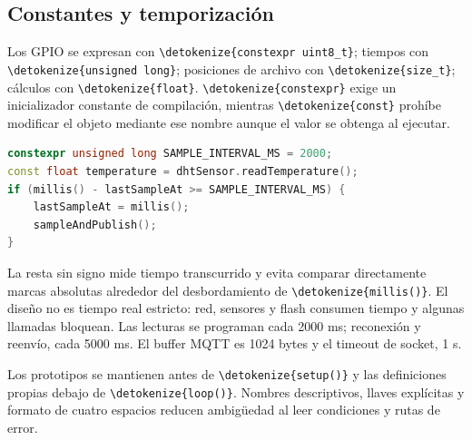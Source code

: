 \documentclass[11pt,a4paper]{article}
\newcommand{\code}[1]{\expandafter\nolinkurl\expandafter{\detokenize{#1}}}
\begin{document}
\subsection{Constantes y temporización}
Los GPIO se expresan con \code{constexpr uint8_t}; tiempos con \code{unsigned long}; posiciones de archivo con \code{size_t}; cálculos con \code{float}. \code{constexpr} exige un inicializador constante de compilación, mientras \code{const} prohíbe modificar el objeto mediante ese nombre aunque el valor se obtenga al ejecutar.
\begin{lstlisting}[language=C++]
constexpr unsigned long SAMPLE_INTERVAL_MS = 2000;
const float temperature = dhtSensor.readTemperature();
if (millis() - lastSampleAt >= SAMPLE_INTERVAL_MS) {
    lastSampleAt = millis();
    sampleAndPublish();
}
\end{lstlisting}
La resta sin signo mide tiempo transcurrido y evita comparar directamente marcas absolutas alrededor del desbordamiento de \code{millis()}. El diseño no es tiempo real estricto: red, sensores y flash consumen tiempo y algunas llamadas bloquean. Las lecturas se programan cada 2000 ms; reconexión y reenvío, cada 5000 ms. El buffer MQTT es 1024 bytes y el timeout de socket, 1 s.

Los prototipos se mantienen antes de \code{setup()} y las definiciones propias debajo de \code{loop()}. Nombres descriptivos, llaves explícitas y formato de cuatro espacios reducen ambigüedad al leer condiciones y rutas de error.

\clearpage
\end{document}
